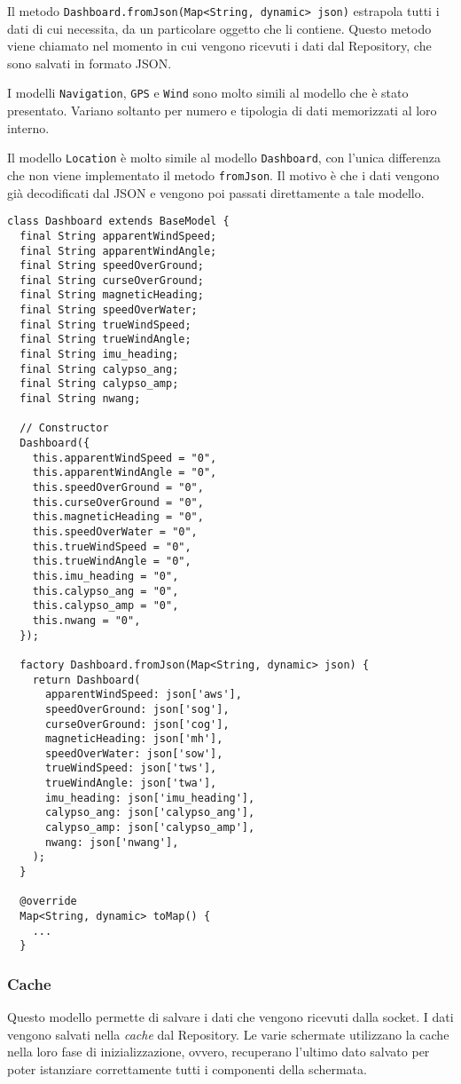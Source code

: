 Il metodo \verb|Dashboard.fromJson(Map<String, dynamic> json)| estrapola tutti i dati di cui necessita, da un particolare oggetto che li contiene. Questo metodo viene chiamato nel momento in cui vengono ricevuti i dati dal Repository, che sono salvati in formato JSON.

I modelli \verb|Navigation|, \verb|GPS| e \verb|Wind| sono molto simili al modello che è stato presentato. Variano soltanto per numero e tipologia di dati memorizzati al loro interno.

Il modello \verb|Location| è molto simile al modello \verb|Dashboard|, con l'unica differenza che non viene implementato il metodo \verb|fromJson|. Il motivo è che i dati vengono già decodificati dal JSON e vengono poi passati direttamente a tale modello.

\begin{lstlisting}
class Dashboard extends BaseModel {
  final String apparentWindSpeed;
  final String apparentWindAngle;
  final String speedOverGround;
  final String curseOverGround;
  final String magneticHeading;
  final String speedOverWater;
  final String trueWindSpeed;
  final String trueWindAngle;
  final String imu_heading;
  final String calypso_ang;
  final String calypso_amp;
  final String nwang;

  // Constructor
  Dashboard({
    this.apparentWindSpeed = "0",
    this.apparentWindAngle = "0",
    this.speedOverGround = "0",
    this.curseOverGround = "0",
    this.magneticHeading = "0",
    this.speedOverWater = "0",
    this.trueWindSpeed = "0",
    this.trueWindAngle = "0",
    this.imu_heading = "0",
    this.calypso_ang = "0",
    this.calypso_amp = "0",
    this.nwang = "0",
  });

  factory Dashboard.fromJson(Map<String, dynamic> json) {
    return Dashboard(
      apparentWindSpeed: json['aws'],
      speedOverGround: json['sog'],
      curseOverGround: json['cog'],
      magneticHeading: json['mh'],
      speedOverWater: json['sow'],
      trueWindSpeed: json['tws'],
      trueWindAngle: json['twa'],
      imu_heading: json['imu_heading'],
      calypso_ang: json['calypso_ang'],
      calypso_amp: json['calypso_amp'],
      nwang: json['nwang'],
    );
  }

  @override
  Map<String, dynamic> toMap() {
  	...
  }
\end{lstlisting}

\subsubsection{Cache}
Questo modello permette di salvare i dati che vengono ricevuti dalla socket. I dati vengono salvati nella \textit{cache} dal Repository. Le varie schermate utilizzano la cache nella loro fase di inizializzazione, ovvero, recuperano l'ultimo dato salvato per poter istanziare correttamente tutti i componenti della schermata.

